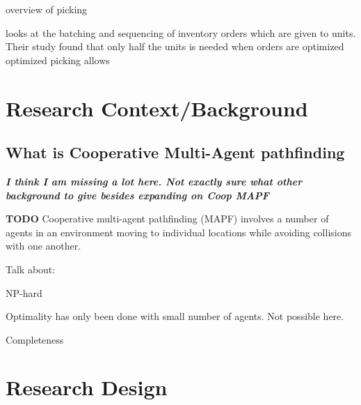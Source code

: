 \documentclass[a4paper,11pt]{article}
\begin{document}


\cite{de2007design} overview of picking

\cite{boysen2017parts} looks at the batching and sequencing of inventory orders which are given to units. Their study found that only half the units is needed when orders are optimized optimized picking allows




\section{Research Context/Background}




\subsection{What is Cooperative Multi-Agent pathfinding}
\noindent \textit{\textbf{I think I am missing a lot here. Not exactly sure what other background to give besides expanding on Coop MAPF}}

\textbf{TODO} Cooperative multi-agent pathfinding (MAPF) involves a number of agents in an environment moving to individual locations while avoiding collisions with one another.

Talk about: 
\begin{compactitem}
	\item NP-hard
	\item Optimality has only been done with small number of agents. Not possible here.
	\item Completeness
\end{compactitem}



\section{Research Design}
\end{document}
